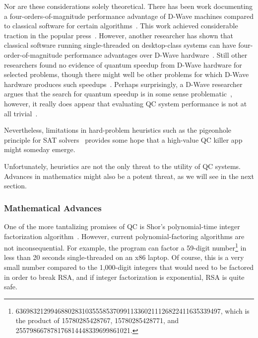 Nor are these considerations solely theoretical.
There has been work documenting a four-orders-of-magnitude
performance advantage of D-Wave machines compared to classical
software for certain algorithms~\cite{McGeoch:2013:EEA:2482767.2482797}.
This work achieved considerable traction in the popular
press~\cite{CharlesChoi2013D-WaveGoogleNASA}.
However, another researcher has shown that classical software running
single-threaded on desktop-class systems can
have four-order-of-magnitude performance advantages over
D-Wave hardware~\cite{AlexSelby2014D-Wave-vs-classical,AlexSelby2013D-WaveHarderQUBO}.
Still other researchers found no evidence of quantum speedup
from D-Wave hardware for selected problems, though there might well be
other problems for which D-Wave hardware produces such
speedups~\cite{AdrianCho2014QC-D-WaveNoSpeedup,TroelsFRonnow2014QC-D-WaveNoSpeedup}.
Perhaps surprisingly, a D-Wave researcher argues that the search for
quantum speedup is in some sense
problematic~\cite{MohammadHAmin2015QC-D-Wave-QuantumSpeedupProblematic},
however, it really does appear that evaluating QC system performance is
not at all
trivial~\cite{PhysRevLett.118.100601,ArsTechnica2017QC-SpeedTradeoffs}.

Nevertheless, limitations in hard-problem heuristics such as the
pigeonhole principle for SAT
solvers~\cite[page~38]{Kroening:2008:DPA:1391237}
provides some hope that a high-value QC killer app might someday emerge.

Unfortunately, heuristics are not the only threat to the utility
of QC systems.
Advances in mathematics might also be a potent threat, as we will see
in the next section.

\subsubsection{Mathematical Advances}
\label{sec:future:Mathematical Advances}

One of the more tantalizing promises of QC is Shor's
polynomial-time integer factorization
algorithm~\cite{Shor:1997:PAP:264393.264406,WikipediaShorsAlgorithm}.
However, current polynomial-factoring algorithms are not
inconsequential.
For example, the  program can factor a 59-digit number\footnote{
	\scriptsize
	63698321299468802831035558537099113360211126822411635339497,
	which is the product of 15780285428767, 15780285428771, and
	255798667878176814448339699861021.}
in less than 20 seconds single-threaded on an x86 laptop.
Of course, this is a very small number compared to the 1,000-digit
integers that would need to be factored in order to break RSA,
and if integer factorization is exponential, RSA is quite safe.

